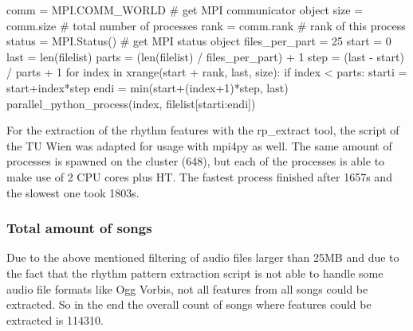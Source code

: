\begin{pythonCode}[frame=single,label={lst:mpi4py},caption={mpi4py},captionpos=b]
comm = MPI.COMM_WORLD   # get MPI communicator object
size = comm.size        # total number of processes
rank = comm.rank        # rank of this process
status = MPI.Status()   # get MPI status object
files_per_part = 25
start = 0
last = len(filelist)
parts = (len(filelist) / files_per_part) + 1
step = (last - start) / parts + 1
for index in xrange(start + rank, last, size):
    if index < parts:        
        starti = start+index*step
        endi = min(start+(index+1)*step, last)
        parallel_python_process(index, filelist[starti:endi])
\end{pythonCode}

\noindent For the extraction of the rhythm features with the rp\_extract tool, the script of the TU Wien was adapted for usage with mpi4py as well. The same amount of processes is spawned on the cluster (648), but each of the processes is able to make use of 2 CPU cores plus HT. The fastest process finished after 1657s and the slowest one took 1803s.

\subsubsection{Total amount of songs}

Due to the above mentioned filtering of audio files larger than 25MB and due to the fact that the rhythm pattern extraction script is not able to handle some audio file formats like Ogg Vorbis, not all features from all songs could be extracted. So in the end the overall count of songs where features could be extracted is 114310.\\


